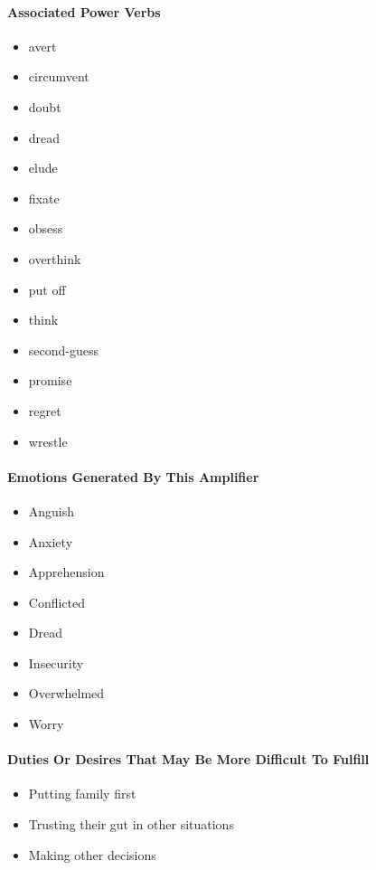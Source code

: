 \paragraph{Associated Power Verbs}

\begin{itemize}
    \item avert
    \item circumvent
    \item doubt
    \item dread
    \item elude
    \item fixate
    \item obsess
    \item overthink
    \item put off
    \item think
    \item second-guess
    \item promise
    \item regret
    \item wrestle
\end{itemize}

\paragraph{Emotions Generated By This Amplifier}

\begin{itemize}
    \item Anguish
    \item Anxiety
    \item Apprehension
    \item Conflicted
    \item Dread
    \item Insecurity
    \item Overwhelmed
    \item Worry
\end{itemize}

\paragraph{Duties Or Desires That May Be More Difficult To Fulfill}

\begin{itemize}
    \item Putting family first
    \item Trusting their gut in other situations
    \item Making other decisions
\end{itemize}

